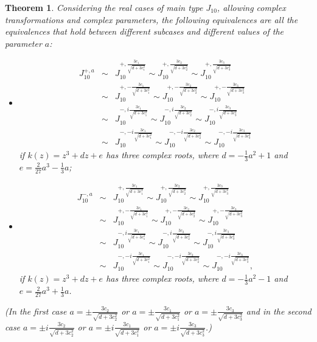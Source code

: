 \documentclass[noend]{amsproc}
\newtheorem{theorem}{Theorem}
\theoremstyle{definition}
\begin{document}
\begin{theorem}
Considering the real cases of main type $J_{10}$, allowing complex transformations and complex parameters, the following equivalences are all the equivalences that hold between different subcases and different values of the parameter $a$:
\begin{itemize}
\item \begin{eqnarray*}
J_{10}^{+,a}&\sim& J_{10}^{+, \frac{3c_1}{\sqrt{d+3c_1^2}}}\sim J_{10}^{+,\frac{3c_2}{\sqrt{d+3c_2^2}}}\sim J_{10}^{+,\frac{3c_3}{\sqrt{d+3c_3^2}}}\\
&\sim& J_{10}^{+,-\frac{3c_1}{\sqrt{d+3c_1^2}}}\sim J_{10}^{+,- \frac{3c_2}{\sqrt{d+3c_2^2}}}\sim J_{10}^{+,- \frac{3c_3}{\sqrt{d+3c_3^2}}}\\
&\sim& J_{10}^{-, i\frac{3c_1}{\sqrt{d+3c_1^2}}}\sim J_{10}^{-,i\frac{3c_2}{\sqrt{d+3c_2^2}}}\sim J_{10}^{-, i\frac{3c_3}{\sqrt{d+3c_3^2}}}\\
&\sim& J_{10}^{-,- i\frac{3c_1}{\sqrt{d+3c_1^2}}}\sim J_{10}^{-,- i\frac{3c_2}{\sqrt{d+3c_2^2}}}\sim J_{10}^{-,- i\frac{3c_3}{\sqrt{d+3c_3^2}}}
\end{eqnarray*}
if $k(z)=z^3+dz+e$
has three complex roots, where $d=-\frac{1}{3}a^2+1$ and $e=\frac{2}{27}a^3-\frac{1}{3}a$;\\
\item \begin{eqnarray*}
J_{10}^{-,a}&\sim& J_{10}^{+,\frac{3c_1}{\sqrt{d+3c_1^2}}}\sim J_{10}^{+,\frac{3c_2}{\sqrt{d+3c_2^2}}}\sim J_{10}^{+,\frac{3c_3}{\sqrt{d+3c_3^2}}}\\
&\sim& J_{10}^{+,-\frac{3c_1}{\sqrt{d+3c_1^2}}}\sim J_{10}^{+,-\frac{3c_2}{\sqrt{d+3c_2^2}}}\sim J_{10}^{+,-\frac{3c_3}{\sqrt{d+3c_3^2}}}\\
&\sim& J_{10}^{-,i\frac{3c_1}{\sqrt{d+3c_1^2}}}\sim J_{10}^{-,i\frac{3c_2}{\sqrt{d+3c_2^2}}}\sim J_{10}^{-,i\frac{3c_3}{\sqrt{d+3c_3^2}}}\\
&\sim& J_{10}^{-,- i\frac{3c_1}{\sqrt{d+3c_1^2}}}\sim J_{10}^{-,- i\frac{3c_2}{\sqrt{d+3c_2^2}}}\sim J_{10}^{-,- i\frac{3c_3}{\sqrt{d+3c_3^2}}},
\end{eqnarray*} if $k(z)=z^3+dz+e$ has three complex roots, where $d=-\frac{1}{3}a^2-1$ and $e=\frac{2}{27}a^3+\frac{1}{3}a$.
\end{itemize}
(In the first case $a=\pm\frac{3c_2}{\sqrt{d+3c_2^2}}$ or $a=\pm\frac{3c_1}{\sqrt{d+3c_1^2}}$ or $a=\pm\frac{3c_3}{\sqrt{d+3c_3^2}}$ and in the second case  $a=\pm i\frac{3c_2}{\sqrt{d+3c_2^2}}$ or $a=\pm i\frac{3c_1}{\sqrt{d+3c_1^2}}$ or $a=\pm i\frac{3c_3}{\sqrt{d+3c_3^2}}$.)


\end{theorem}
\end{document}

